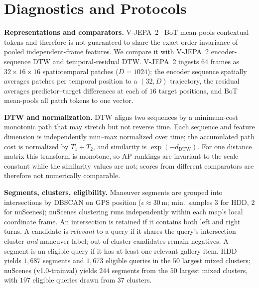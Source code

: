 \documentclass[runningheads]{llncs}
\begin{document}
\section{Diagnostics and Protocols}
\label{sec:protocols}
\textbf{Representations and comparators.} V-JEPA~2~\cite{vjepa2} BoT mean-pools contextual tokens
and therefore is not guaranteed to share the exact order invariance of pooled independent-frame features.
We compare it with V-JEPA~2 encoder-sequence DTW and temporal-residual DTW. V-JEPA~2 ingests $64$
frames as $32\times16\times16$ spatiotemporal patches ($D{=}1024$); the encoder sequence
spatially averages patches per temporal position to a $(32, D)$ trajectory, the residual averages
predictor--target differences at each of $16$ target positions, and BoT mean-pools all patch tokens
to one vector.

\textbf{DTW and normalization.} DTW aligns two sequences by a minimum-cost monotonic path that may
stretch but not reverse time. Each sequence and feature dimension is independently min--max
normalized over time; the accumulated path cost is normalized by $T_1{+}T_2$, and similarity is
$\exp(-d_\mathrm{DTW})$. For one distance matrix this transform is monotone, so AP rankings are
invariant to the scale constant while the similarity values are not; scores from different
comparators are therefore not numerically comparable.

\textbf{Segments, clusters, eligibility.} Maneuver segments are grouped into intersections by DBSCAN
on GPS position ($\epsilon{\approx}30$\,m; min.\ samples $3$ for HDD, $2$ for nuScenes); nuScenes
clustering runs independently within each map's local coordinate frame. An
intersection is retained if it contains both left and right turns. A candidate is \emph{relevant} to a query if it shares the
query's intersection cluster \emph{and} maneuver label; out-of-cluster candidates remain negatives.
A segment is an eligible query if it has at least one relevant gallery item. HDD yields $1{,}687$
segments and $1{,}673$ eligible queries in the $50$ largest mixed clusters; nuScenes
(v1.0-trainval) yields $244$ segments from the $50$ largest mixed clusters, with $197$ eligible
queries drawn from $37$ clusters.
\end{document}

